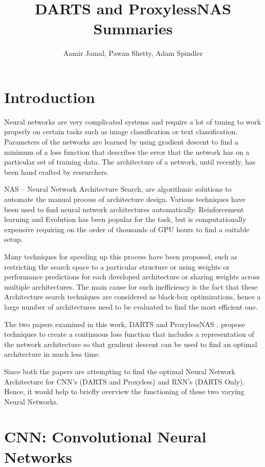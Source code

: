 \documentclass{ieee}
\title{DARTS and ProxylessNAS Summaries}
\author{Aamir Jamal, Pawan Shetty, Adam Spindler}
\begin{document}
\maketitle

\section{Introduction}
Neural networks are very complicated systems and require a lot of tuning to work properly on certain tasks such as image classification or text classification. Parameters of the networks are learned by using gradient descent to find a minimum of a loss function that describes the error that the network has on a particular set of training data. The architecture of a network, until recently, has been hand crafted by researchers.


NAS – Neural Network Architecture Search, are algorithmic solutions to automate the manual process of architecture design. Various techniques have been used to find neural network architectures automatically. Reinforcement learning and Evolution has been popular for the task, but is computationally expensive requiring on the order of thousands of GPU hours to find a suitable setup. 

Many techniques for speeding up this process have been proposed, such as restricting the search space to a particular structure or using weights or performance predictions for each developed architecture or sharing weights across multiple architectures. The main cause for such inefficiency is the fact that these Architecture search techniques are considered as black-box optimizations, hence a large number of architectures need to be evaluated to find the most efficient one. 

The two papers examined in this work, DARTS \cite{DARTSMODEL} and ProxylessNAS \cite{cai2018proxylessnas}, propose techniques to create a continuous loss function that includes a representation of the network architecture so that gradient descent can be used to find an optimal architecture in much less time.

Since both the papers are attempting to find the optimal Neural Network Architecture for CNN's (DARTS and Proxyless) and RNN's (DARTS Only). Hence, it would help to briefly overview the functioning of these two varying Neural Networks.


\section{CNN: Convolutional Neural Networks}
\end{document}
